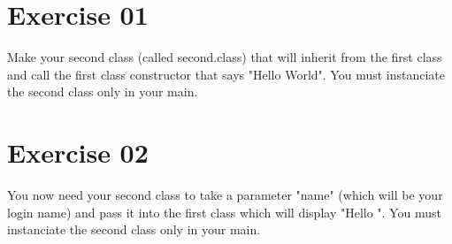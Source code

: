\documentclass{42-en}
\begin{document}

\chapter{Exercise 01}


\makeheaderfiles

Make your second class (called second.class) that will inherit from the first class and call the first class constructor that says "Hello World". You must instanciate the second class only in your main.



\chapter{Exercise 02}


\makeheaderfiles

You now need your second class to take a parameter "name" (which will be your login name) and pass it into the first class which will display "Hello ". You must instanciate the second class only in your main.
\end{document}
